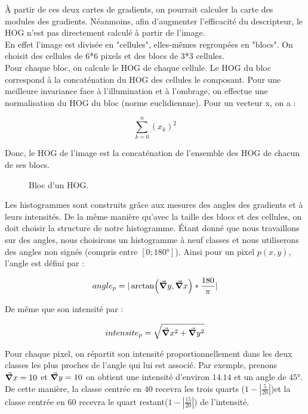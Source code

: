 À partir de ces deux cartes de gradients, on pourrait calculer la carte des modules des gradients. Néanmoins, afin d'augmenter l'efficacité du descripteur, le HOG n'est pas directement calculé à partir de l'image.\\

En effet l'image est divisée en "cellules", elles-mêmes regroupées en "blocs". On choisit des cellules de 6*6 pixels et des blocs de 3*3 cellules.\\

Pour chaque bloc, on calcule le HOG de chaque cellule. Le HOG du bloc correspond à la concaténation du HOG des cellules le composant. Pour une meilleure invariance face à l'illumination et à l'ombrage, on effectue une normalisation du HOG du bloc (norme euclidiennne). Pour un vecteur x, on a :

\[ \sum_{k=0}^{n} (x_{k})^{2} \]

Donc, le HOG de l'image est la concaténation de l'ensemble des HOG de chacun de ses blocs.

\begin{figure}[!htbp]
\center
\caption{Bloc d'un HOG.}
\label{fig:cuttlefish_bloccells}
\end{figure}
\FloatBarrier

Les histogrammes sont construits grâce aux mesures des angles des gradients et à leurs intensités. De la même manière qu'avec la taille des blocs et des cellules, on doit choisir la structure de notre histogramme. Étant donné que nous travaillons sur des angles, nous choisirons un histogramme à neuf classes et nous utiliserons des angles non signés (compris entre $[0; 180°]$).
Ainsi pour un pixel $p(x,y)$, l'angle est défini par :

\[ angle_{p} = |\arctan (\grad y, \grad x)*\frac{180}{\pi}| \]

De même que son intensité par :

\[ intensite_{p} = \sqrt{\grad x^{2} + \grad y^{2}} \]

Pour chaque pixel, on répartit son intensité proportionnellement dans les deux classes les plus proches de l'angle qui lui est associé. 
Par exemple, prenons $\grad x = 10$ et $\grad y = 10$ on obtient une intensité d'environ $14.14$ et un angle de $45°$. De cette manière, la classe centrée en $40$ recevra les trois quarts ($1 - |\frac{5}{20}|$)et la classe centrée en $60$ recevra le quart restant($1 - |\frac{15}{20}|$) de l'intensité.\\


